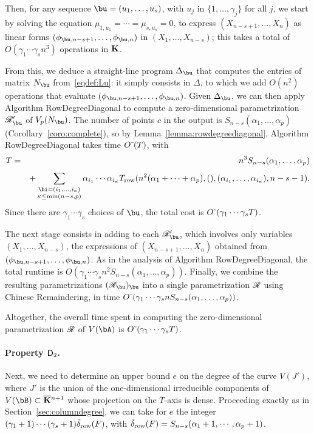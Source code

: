 \documentclass[12pt]{article}
\begin{document}
Then, for any sequence $\bu=(u_1,\dots,u_s)$, with $u_j$ in
$\{1,\dots,\gamma_j\}$ for all $j$, we start by solving the equation
$\mu_{1,u_1} = \cdots = \mu_{s,u_s}=0$, to express
$(X_{n-s+1},\dots,X_n)$ as linear forms
$(\phi_{\bu,n-s+1},\dots,\phi_{\bu,n})$ in $(X_1,\dots,X_{n-s})$; this
takes a total of $O(\gamma_1 \cdots \gamma_s n^3)$ operations in $\mathbf{K}$.

From this, we deduce a straight-line program $\Delta_\bu$ that
computes the entries of matrix $\mN_\bu$ from~\eqref{eqdef:Lu}: it
simply consists in $\Delta$, to which we add $O(n^2)$ operations that
evaluate $(\phi_{\bu,n-s+1},\dots,\phi_{\bu,n})$. Given $\Delta_\bu$, we 
can then apply Algorithm {\sf RowDegreeDiagonal} to compute 
a zero-dimensional parametrization $\scrR'_\bu$ of $V_p(\mN_\bu)$.
The number of points $c$ in the output is $S_{n-s}(\alpha_1,\dots,\alpha_p)$
(Corollary~\ref{coro:complete}),
so by Lemma~\ref{lemma:rowdegreediagonal}, Algorithm {\sf RowDegreeDiagonal} takes time ${O}{\,\tilde{ }\,}(T)$, 
with
\begin{eqnarray}\label{eqdef:T}
T&=&n^3 S_{n-s}(\alpha_1,\dots,\alpha_p) \nonumber \\[1mm]
 & &+ \sum_{\substack{\bi=(i_1,\dots,i_\kappa)\\ \kappa\le\min(n-s,p)}}
\alpha_{i_1} \cdots \alpha_{i_\kappa} T_{\rm row}(n^2(\alpha_1 + \cdots + \alpha_p), (), (\alpha_{i_1},\dots,\alpha_{i_\kappa}), n-s-1).  
\end{eqnarray}
Since there are  $\gamma_1 \cdots \gamma_s$ choices of $\bu$,
the total cost is ${O}{\,\tilde{ }\,}(\gamma_1 \cdots \gamma_s T)$.

The next stage consists in adding to each $\scrR'_\bu$, which involves
only variables $(X_1,\dots,X_{n-s})$, the expressions of
$(X_{n-s+1},\dots,X_n)$ obtained from
$(\phi_{\bu,n-s+1},\dots,\phi_{\bu,n})$. As in the analysis of
Algorithm {\sf RowDegreeDiagonal}, the total runtime is $O(\gamma_1
\cdots \gamma_s n^2 S_{n-s}(\alpha_1,\dots,\alpha_p))$. Finally, we
combine the resulting parametrizations $(\scrR_\bu)_\bu$ into a single
parametrization $\mathscr{R}$ using Chinese Remaindering, in time
${O}{\,\tilde{ }\,}(\gamma_1 \cdots \gamma_s n S_{n-s}(\alpha_1,\dots,\alpha_p))$.

Altogether, the overall time spent in computing the zero-dimensional
parametrization $\mathscr{R}$ of $V(\bA)$ is ${O}{\,\tilde{ }\,}(\gamma_1 \cdots
\gamma_s T)$.


\paragraph{Property $\mathsf{D}_2$.} Next, we need to determine an upper bound 
$e$ on the degree of the curve $V(J')$, where $J'$ is the union of the
one-dimensional irreducible components of $V(\bB) \subset
\KKbar{}^{n+1}$ whose projection on the $T$-axis is dense. Proceeding
exactly as in Section~\ref{sec:columndegree}, we can take for $e$ the
integer $(\gamma_1+1)\cdots(\gamma_s+1) \tilde\delta_{\rm row}({F})$,
with $\tilde\delta_{\rm row}({F})=S_{n-s}(\alpha_1 +1,\cdots,\alpha_p+1)$.
\end{document}
